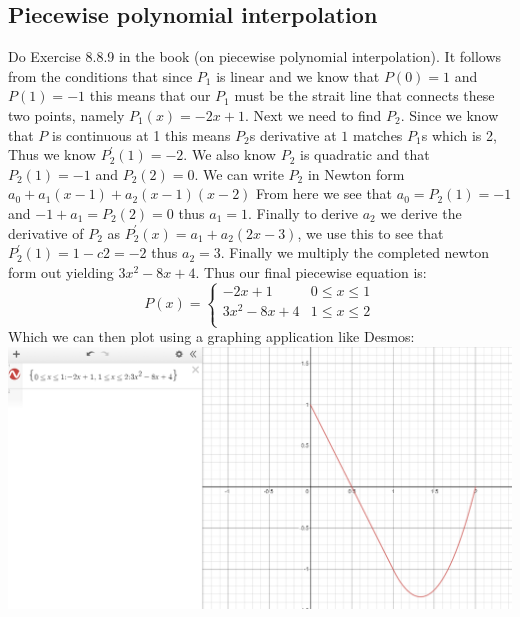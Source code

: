 \documentclass{article}
\begin{document}
\newpage
\subsection{Piecewise polynomial interpolation}
Do Exercise 8.8.9 in the book (on piecewise polynomial interpolation).
\newline\newline
It follows from the conditions that since $P_1$ is linear and we know that $P(0) = 1$ and $P(1) = -1$ this means that our $P_1$ must be the strait line that connects these two points, namely $P_1(x) = -2x + 1$.
\newline\newline
Next we need to find $P_2$. Since we know that $P$ is continuous at 1 this means $P_2$s derivative at $1$ matches $P_1$s which is 2, Thus we know $P^{'}_2(1)=-2$. We also know $P_2$ is quadratic and that $P_2(1)=-1$ and $P_2(2)=0$. We can write $P_2$ in Newton form $a_0+a_1(x-1)+a_2(x-1)(x-2)$ From here we see that $a_0 = P_2(1) = -1$ and $-1 + a_1 = P_2(2) = 0$ thus $a_1 = 1$. Finally to derive $a_2$ we derive the derivative of $P_2$ as $P^{'}_2(x) = a_1+a_2(2x-3)$, we use this to see that $P^{'}_2(1) = 1 - c2 = -2$ thus $a_2=3$. Finally we multiply the completed newton form out yielding $3x^2-8x+4$.
Thus our final piecewise equation is:
\[ P(x)=\begin{cases} 
      -2x + 1 & 0\leq x \leq1 \\
      3x^2-8x+4 & 1\leq x\leq 2 \\
   \end{cases}
\]
\newline\newline
Which we can then plot using a graphing application like Desmos:
\newline\newline
\includegraphics[scale=0.4]{Homework4/44.png}
\end{document}
